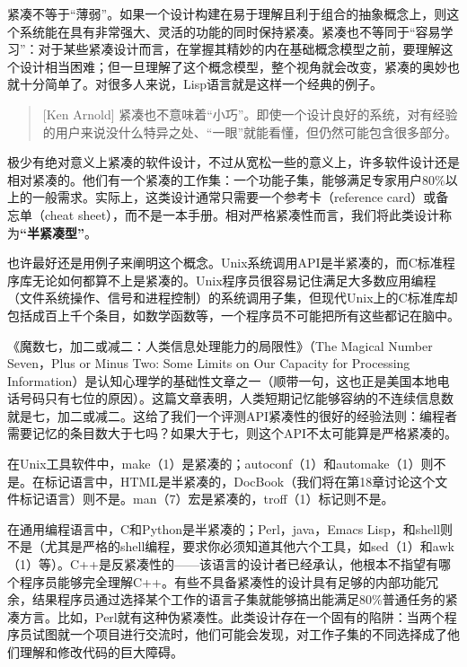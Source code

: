\documentclass[12pt,oneside]{book}
\begin{document}
\begin{common-format}
紧凑不等于“薄弱”。如果一个设计构建在易于理解且利于组合的抽象概念上，则这个系统能在具有非常强大、灵活的功能的同时保持紧凑。紧凑也不等同于“容易学习”：对于某些紧凑设计而言，在掌握其精妙的内在基础概念模型之前，要理解这个设计相当困难；但一旦理解了这个概念模型，整个视角就会改变，紧凑的奥妙也就十分简单了。对很多人来说，Lisp语言就是这样一个经典的例子。

\begin{quote}[Ken Arnold]
紧凑也不意味着“小巧”。即使一个设计良好的系统，对有经验的用户来说没什么特异之处、“一眼”就能看懂，但仍然可能包含很多部分。
\end{quote}

极少有绝对意义上紧凑的软件设计，不过从宽松一些的意义上，许多软件设计还是相对紧凑的。他们有一个紧凑的工作集：一个功能子集，能够满足专家用户80\%以上的一般需求。实际上，这类设计通常只需要一个参考卡（reference card）或备忘单（cheat sheet），而不是一本手册。相对严格紧凑性而言，我们将此类设计称为\textbf{“半紧凑型”}。

也许最好还是用例子来阐明这个概念。Unix系统调用API是半紧凑的，而C标准程序库无论如何都算不上是紧凑的。Unix程序员很容易记住满足大多数应用编程（文件系统操作、信号和进程控制）的系统调用子集，但现代Unix上的C标准库却包括成百上千个条目，如数学函数等，一个程序员不可能把所有这些都记在脑中。

《魔数七，加二或减二：人类信息处理能力的局限性》（The Magical Number Seven，Plus or Minus Two: Some Limits on Our Capacity for Processing Information\cite{Miller}）是认知心理学的基础性文章之一（顺带一句，这也正是美国本地电话号码只有七位的原因）。这篇文章表明，人类短期记忆能够容纳的不连续信息数就是七，加二或减二。这给了我们一个评测API紧凑性的很好的经验法则：编程者需要记忆的条目数大于七吗？如果大于七，则这个API不太可能算是严格紧凑的。

在Unix工具软件中，make（1）是紧凑的；autoconf（1）和automake（1）则不是。在标记语言中，HTML是半紧凑的，DocBook（我们将在第18章讨论这个文件标记语言）则不是。man（7）宏是紧凑的，troff（1）标记则不是。

在通用编程语言中，C和Python是半紧凑的；Perl，java，Emacs Lisp，和shell则不是（尤其是严格的shell编程，要求你必须知道其他六个工具，如sed（1）和awk（1）等）。C++是反紧凑性的——该语言的设计者已经承认，他根本不指望有哪个程序员能够完全理解C++。有些不具备紧凑性的设计具有足够的内部功能冗余，结果程序员通过选择某个工作的语言子集就能够搞出能满足80\%普通任务的紧凑方言。比如，Perl就有这种伪紧凑性。此类设计存在一个固有的陷阱：当两个程序员试图就一个项目进行交流时，他们可能会发现，对工作子集的不同选择成了他们理解和修改代码的巨大障碍。


\end{common-format}
\end{document}
